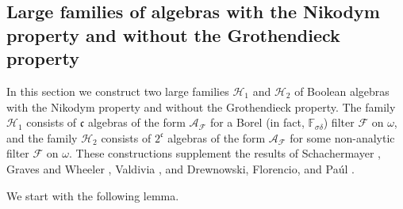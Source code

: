 \documentclass[a4paper,11pt,fleqn]{amsart}
\theoremstyle{definition}
\theoremstyle{remark}
\numberwithin{equation}{section}
\newcommand{\frakc}{\mathfrak{c}}
\newcommand{\aA}{\mathcal{A}}
\newcommand{\fF}{\mathcal{F}}
\newcommand{\hH}{\mathcal{H}}
\begin{document}
\subsection{Large families of algebras with the Nikodym property and without the Grothendieck property\label{sec:definable_large}}

In this section we construct two large families $\hH_1$ and $\hH_2$ of Boolean algebras with the Nikodym property and without the Grothendieck property. The family $\hH_1$ consists of $\frakc$ algebras of the form $\aA_{\fF}$ for a Borel (in fact, $\mathbb{F}_{\sigma\delta}$) filter $\fF$ on $\omega$, and the family $\hH_2$ consists of $2^\frakc$ algebras of the form $\aA_{\fF}$ for some non-analytic filter $\fF$ on $\omega$. These constructions supplement the results of Schachermayer \cite{Sch82}, Graves and Wheeler \cite{GW83}, Valdivia \cite{Val13}, and Drewnowski, Florencio, and Pa\'ul \cite[Remark 4]{DFP94}.

We start with the following lemma.
\end{document}
